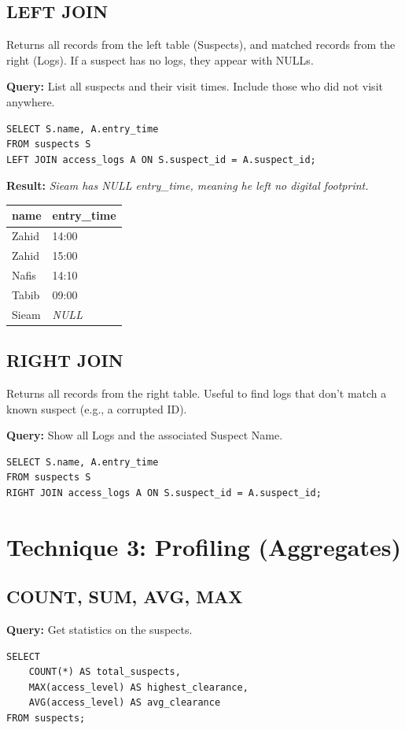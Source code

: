 \documentclass[12pt,a4paper]{article}
\begin{document}
\subsection{LEFT JOIN}
Returns all records from the left table (Suspects), and matched records from the right (Logs). If a suspect has no logs, they appear with NULLs.

\textbf{Query:} List all suspects and their visit times. Include those who did not visit anywhere.
\begin{lstlisting}
SELECT S.name, A.entry_time
FROM suspects S
LEFT JOIN access_logs A ON S.suspect_id = A.suspect_id;
\end{lstlisting}

\textbf{Result:}
\textit{Sieam has NULL entry\_time, meaning he left no digital footprint.}
\begin{table}[H]
\centering
\begin{tabular}{@{}ll@{}}
\toprule
\textbf{name} & \textbf{entry\_time} \\ \midrule
Zahid & 14:00 \\
Zahid & 15:00 \\
Nafis & 14:10 \\
Tabib & 09:00 \\
Sieam & \textit{NULL} \\ \bottomrule
\end{tabular}
\end{table}

\subsection{RIGHT JOIN}
Returns all records from the right table. Useful to find logs that don't match a known suspect (e.g., a corrupted ID).

\textbf{Query:} Show all Logs and the associated Suspect Name.
\begin{lstlisting}
SELECT S.name, A.entry_time
FROM suspects S
RIGHT JOIN access_logs A ON S.suspect_id = A.suspect_id;
\end{lstlisting}

\section{Technique 3: Profiling (Aggregates)}

\subsection{COUNT, SUM, AVG, MAX}
\textbf{Query:} Get statistics on the suspects.
\begin{lstlisting}
SELECT 
    COUNT(*) AS total_suspects,
    MAX(access_level) AS highest_clearance,
    AVG(access_level) AS avg_clearance
FROM suspects;
\end{lstlisting}
\end{document}
